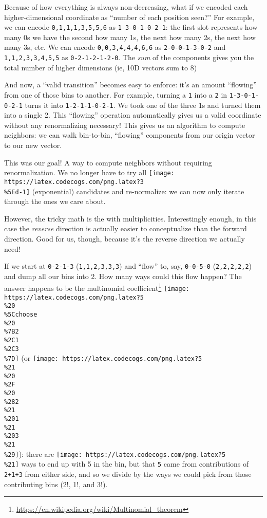 \documentclass[]{article}
\renewcommand{\href}[2]{#2\footnote{\url{#1}}}
\begin{document}
Because of how everything is always non-decreasing, what if we encoded each
higher-dimensional coordinate as ``number of each position seen?'' For example,
we can encode \texttt{0,1,1,1,3,5,5,6} as \texttt{1-3-0-1-0-2-1}: the first slot
represents how many 0s we have the second how many 1s, the next how many 2s, the
next how many 3s, etc. We can encode \texttt{0,0,3,4,4,4,6,6} as
\texttt{2-0-0-1-3-0-2} and \texttt{1,1,2,3,3,4,5,5} as \texttt{0-2-1-2-1-2-0}.
The \emph{sum} of the components gives you the total number of higher dimensions
(ie, 10D vectors sum to 8)

And now, a ``valid transition'' becomes easy to enforce: it's an amount
``flowing'' from one of those bins to another. For example, turning a \texttt{1}
into a \texttt{2} in \texttt{1-3-0-1-0-2-1} turns it into
\texttt{1-2-1-1-0-2-1}. We took one of the three 1s and turned them into a
single 2. This ``flowing'' operation automatically gives us a valid coordinate
without any renormalizing necessary! This gives us an algorithm to compute
neighbors: we can walk bin-to-bin, ``flowing'' components from our origin vector
to our new vector.

This was our goal! A way to compute neighbors without requiring renormalization.
We no longer have to try all
\texttt{[image: https://latex.codecogs.com/png.latex?3\\\%5Ed-1]} (exponential)
candidates and re-normalize: we can now only iterate through the ones we care
about.

However, the tricky math is the with multiplicities. Interestingly enough, in
this case the \emph{reverse} direction is actually easier to conceptualize than
the forward direction. Good for us, though, because it's the reverse direction
we actually need!

If we start at \texttt{0-2-1-3} (\texttt{1,1,2,3,3,3}) and ``flow'' to, say,
\texttt{0-0-5-0} (\texttt{2,2,2,2,2}) and dump all our bins into 2. How many
ways could this flow happen? The answer happens to be the
\href{https://en.wikipedia.org/wiki/Multinomial_theorem}{multinomial
coefficient}
\texttt{[image: https://latex.codecogs.com/png.latex?5\\\%20\\\%5Cchoose\\\%20\\\%7B2\\\%2C1\\\%2C3\\\%7D]}
(or
\texttt{[image: https://latex.codecogs.com/png.latex?5\\\%21\\\%20\\\%2F\\\%20\\\%282\\\%21\\\%201\\\%21\\\%203\\\%21\\\%29]}):
there are \texttt{[image: https://latex.codecogs.com/png.latex?5\\\%21]} ways to
end up with 5 in the bin, but that \texttt{5} came from contributions of
\texttt{2+1+3} from either side, and so we divide by the ways we could pick from
those contributing bins (2!, 1!, and 3!).
\end{document}
